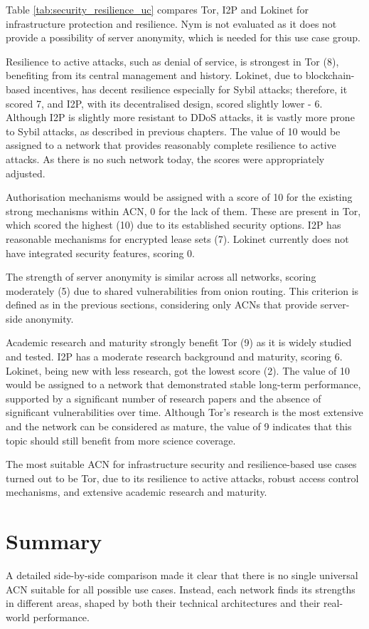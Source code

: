 Table \ref{tab:security_resilience_uc} compares Tor, I2P and Lokinet for infrastructure protection and resilience. Nym is not evaluated as it does not provide a possibility of server anonymity, which is needed for this use case group.

Resilience to active attacks, such as denial of service, is strongest in Tor (8), benefiting from its central management and history. Lokinet, due to blockchain-based incentives, has decent resilience especially for Sybil attacks; therefore, it scored 7, and I2P, with its decentralised design, scored slightly lower - 6. Although I2P is slightly more resistant to DDoS attacks, it is vastly more prone to Sybil attacks, as described in previous chapters. The value of 10 would be assigned to a network that provides reasonably complete resilience to active attacks. As there is no such network today, the scores were appropriately adjusted.

Authorisation mechanisms would be assigned with a score of 10 for the existing strong mechanisms within ACN, 0 for the lack of them. These are present in Tor, which scored the highest (10) due to its established security options. I2P has reasonable mechanisms for encrypted lease sets (7). Lokinet currently does not have integrated security features, scoring 0.

The strength of server anonymity is similar across all networks, scoring moderately (5) due to shared vulnerabilities from onion routing. This criterion is defined as in the previous sections, considering only ACNs that provide server-side anonymity.

Academic research and maturity strongly benefit Tor (9) as it is widely studied and tested. I2P has a moderate research background and maturity, scoring 6. Lokinet, being new with less research, got the lowest score (2). The value of 10 would be assigned to a network that demonstrated stable long-term performance, supported by a significant number of research papers and the absence of significant vulnerabilities over time. Although Tor's research is the most extensive and the network can be considered as mature, the value of 9 indicates that this topic should still benefit from more science coverage.

The most suitable ACN for infrastructure security and resilience-based use cases turned out to be Tor, due to its resilience to active attacks, robust access control mechanisms, and extensive academic research and maturity.

\section{Summary}
A detailed side-by-side comparison made it clear that there is no single universal ACN suitable for all possible use cases. Instead, each network finds its strengths in different areas, shaped by both their technical architectures and their real-world performance.

